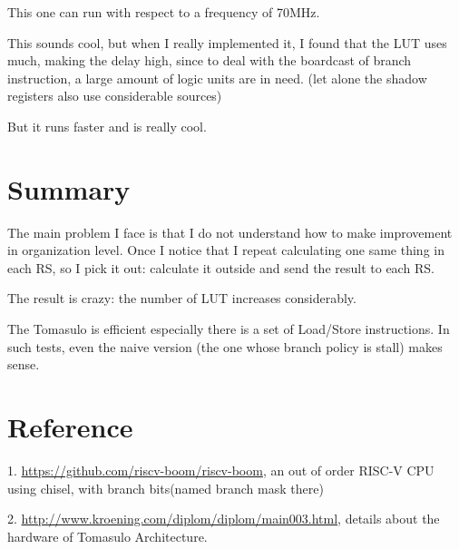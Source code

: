 \documentclass[12pt,letterpaper]{article}
\begin{document}
    This one can run with respect to a frequency of 70MHz. 

    This sounds cool, but when I really implemented it, I found that the LUT uses much, making the delay high, 
    since to deal with the boardcast of branch instruction, a large amount of logic units are in need. 
    (let alone the shadow registers also use considerable sources)

    But it runs faster and is really cool. 
\section{Summary}
    The main problem I face is that I do not understand how to make improvement in organization level. Once I notice that I repeat 
    calculating one same thing in each RS, so I pick it out: calculate it outside and send the result to each RS. 

    The result is crazy: the number of LUT increases considerably. 

    The Tomasulo is efficient especially there is a set of Load/Store instructions. In such tests, even the naive version
    (the one whose branch policy is stall) makes sense. 
\section{Reference}

1. \url{https://github.com/riscv-boom/riscv-boom}, an out of order RISC-V CPU using chisel, with branch bits(named branch mask there)

2. \url{http://www.kroening.com/diplom/diplom/main003.html}, details about the hardware of Tomasulo Architecture.
\end{document}
